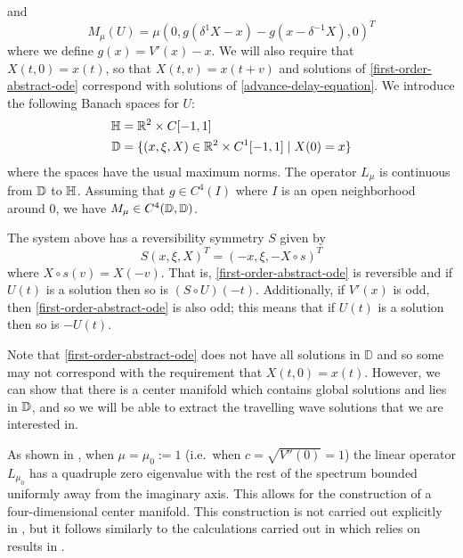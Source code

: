 and 
\begin{equation}
	M_\mu(U) = \mu (0, g(\delta^1X -x) - g(x- \delta^{-1} X), 0)^T
\end{equation}
where we define \(g(x)= V'(x) - x\). We will also require that \(X(t,0) = x(t)\), so that \(X(t,v) = x(t+v)\) and solutions of \cref{first-order-abstract-ode} correspond with solutions of \cref{advance-delay-equation}. We introduce the following Banach spaces for \(U\):
\begin{equation}
	\begin{aligned}
		\mathbb{H} &= \mathbb{R}^2 \times C[-1,1] \\
		\mathbb{D} &= \{(x, \xi, X) \in \mathbb{R}^2 \times C^1[-1,1] \mid X(0) = x\}
	\end{aligned}
\end{equation}
where the spaces have the usual maximum norms. The operator \(L_\mu\) is continuous from \(\mathbb{D}\) to \(\mathbb{H}\). Assuming that \(g\in C^4(I)\) where \(I\) is an open neighborhood around \(0\), we have \(M_\mu \in C^4(\mathbb{D},\mathbb{D})\).

The system above has a reversibility symmetry \(S\) given by 
\begin{equation}
	S(x, \xi, X)^T = (-x, \xi, -X \circ s)^T
\end{equation}
where \(X\circ s (v) = X(-v)\). That is, \cref{first-order-abstract-ode} is reversible and if \(U(t)\) is a solution then so is \((S\circ U)(-t)\). Additionally, if \(V'(x)\) is odd, then \cref{first-order-abstract-ode} is also odd; this means that if \(U(t)\) is a solution then so is \(-U(t)\).

Note that \cref{first-order-abstract-ode} does not have all solutions in \(\mathbb D\) and so some may not correspond with the requirement that \(X(t,0) = x(t)\). However, we can show that there is a center manifold which contains global solutions and lies in \(\mathbb{D}\), and so we will be able to extract the travelling wave solutions that we are interested in.

As shown in \cite[Lem.\ 1]{iooss2000travelling}, when \(\mu = \mu_0:= 1\) (i.e.\ when \(c = \sqrt{V''(0)} = 1\)) the linear operator \(L_{\mu_0}\) has a quadruple zero eigenvalue with the rest of the spectrum bounded uniformly away from the imaginary axis. This allows for the construction of a four-dimensional center manifold. This construction is not carried out explicitly in \cite{iooss2000travelling}, but it follows similarly to the calculations carried out in \cite{iooss2000travelling2} which relies on results in \cite{vanderbauwhede1992center}.

